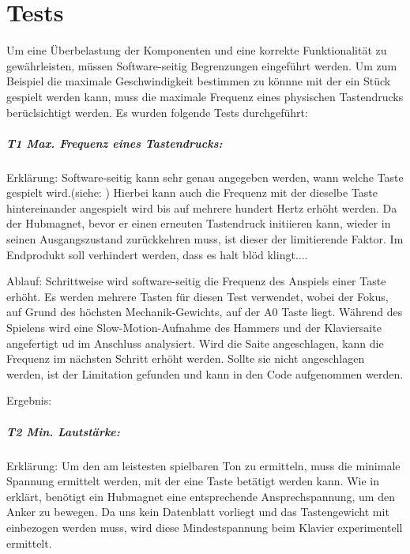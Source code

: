 \chapter{Tests}\label{tests}

\nocite{*}


    Um eine Überbelastung der Komponenten und eine korrekte Funktionalität zu gewährleisten, müssen Software-seitig Begrenzungen eingeführt werden.
    Um zum Beispiel die maximale Geschwindigkeit bestimmen zu könnne mit der ein Stück gespielt werden kann, muss die maximale Frequenz eines physischen Tastendrucks berüclsichtigt werden.
    Es wurden folgende Tests durchgeführt:

    \paragraph{T1 Max. Frequenz eines Tastendrucks:}
    Erklärung: Software-seitig kann sehr genau angegeben werden, wann welche Taste gespielt wird.(siehe: )
    Hierbei kann auch die Frequenz mit der dieselbe Taste hintereinander angespielt wird bis auf mehrere hundert Hertz erhöht werden.
    Da der Hubmagnet, bevor er einen erneuten Tastendruck initiieren kann, wieder in seinen Ausgangszustand zurückkehren muss, ist dieser der limitierende Faktor.
    Im Endprodukt soll verhindert werden, dass es halt blöd klingt....

    Ablauf: Schrittweise wird software-seitig die Frequenz des Anspiels einer Taste erhöht.
    Es werden mehrere Tasten für diesen Test verwendet, wobei der Fokus, auf Grund des höchsten Mechanik-Gewichts, auf der A0 Taste liegt.
    Während des Spielens wird eine Slow-Motion-Aufnahme des Hammers und der Klaviersaite angefertigt ud im Anschluss analysiert.
    Wird die Saite angeschlagen, kann die Frequenz im nächsten Schritt erhöht werden.
    Sollte sie nicht angeschlagen werden, ist der Limitation gefunden und kann in den Code aufgenommen werden.

    Ergebnis:

    \paragraph{T2 Min. Lautstärke:}
    Erklärung: Um den am leistesten spielbaren Ton zu ermitteln, muss die minimale Spannung ermittelt werden, mit der eine Taste betätigt werden kann.
    Wie in  erklärt, benötigt ein Hubmagnet eine entsprechende Ansprechspannung, um den Anker zu bewegen.
    Da uns kein Datenblatt vorliegt und das Tastengewicht mit einbezogen werden muss, wird diese Mindestspannung beim Klavier experimentell ermittelt.

